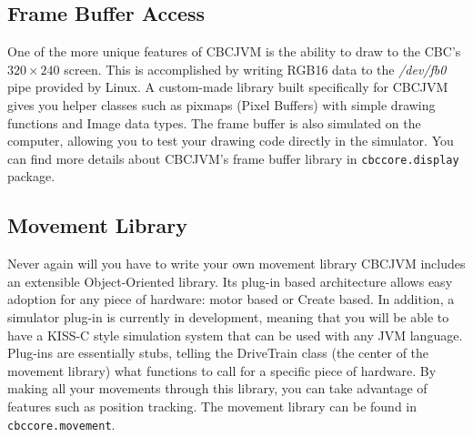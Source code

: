 \documentclass[12pt,letterpaper]{article}
\begin{document}
\subsection{Frame Buffer Access}

One of the more unique features of CBCJVM is the ability to draw to the CBC's $320 \times 240$ screen. This is accomplished by writing RGB16 data to the \textsl{/dev/fb0} pipe provided by Linux. A custom-made library built specifically for CBCJVM gives you helper classes such as pixmaps (Pixel Buffers) with simple drawing functions and Image data types. The frame buffer is also simulated on the computer, allowing you to test your drawing code directly in the simulator. You can find more details about CBCJVM's frame buffer library in \texttt{cbccore.display} package.



\subsection{Movement Library}

Never again will you have to write your own movement library CBCJVM includes an extensible Object-Oriented library. Its plug-in based architecture allows easy adoption for any piece of hardware: motor based or Create based. In addition, a simulator plug-in is currently in development, meaning that you will be able to have a KISS-C style simulation system that can be used with any JVM language. Plug-ins are essentially stubs, telling the DriveTrain class (the center of the movement library) what functions to call for a specific piece of hardware. By making all your movements through this library, you can take advantage of features such as position tracking. The movement library can be found in \texttt{cbccore.movement}.
\end{document}

